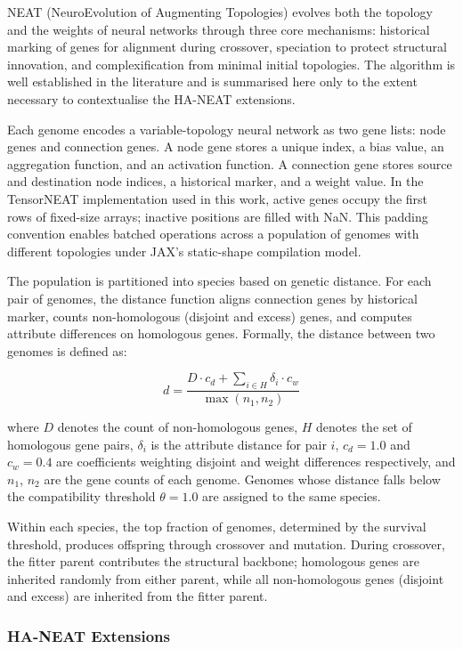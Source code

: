 \documentclass[12pt]{article}
\begin{document}
NEAT (NeuroEvolution of Augmenting Topologies) evolves both the topology and the weights of neural networks through three core mechanisms: historical marking of genes for alignment during crossover, speciation to protect structural innovation, and complexification from minimal initial topologies. The algorithm is well established in the literature and is summarised here only to the extent necessary to contextualise the HA-NEAT extensions.

Each genome encodes a variable-topology neural network as two gene lists: node genes and connection genes. A node gene stores a unique index, a bias value, an aggregation function, and an activation function. A connection gene stores source and destination node indices, a historical marker, and a weight value. In the TensorNEAT implementation used in this work, active genes occupy the first rows of fixed-size arrays; inactive positions are filled with NaN. This padding convention enables batched operations across a population of genomes with different topologies under JAX's static-shape compilation model.

The population is partitioned into species based on genetic distance. For each pair of genomes, the distance function aligns connection genes by historical marker, counts non-homologous (disjoint and excess) genes, and computes attribute differences on homologous genes. Formally, the distance between two genomes is defined as:

$$d = \frac{D \cdot c_d + \sum_{i \in H} \delta_i \cdot c_w}{\max(n_1, n_2)}$$

where $D$ denotes the count of non-homologous genes, $H$ denotes the set of homologous gene pairs, $\delta_i$ is the attribute distance for pair $i$, $c_d = 1.0$ and $c_w = 0.4$ are coefficients weighting disjoint and weight differences respectively, and $n_1$, $n_2$ are the gene counts of each genome. Genomes whose distance falls below the compatibility threshold $\theta = 1.0$ are assigned to the same species.

Within each species, the top fraction of genomes, determined by the survival threshold, produces offspring through crossover and mutation. During crossover, the fitter parent contributes the structural backbone; homologous genes are inherited randomly from either parent, while all non-homologous genes (disjoint and excess) are inherited from the fitter parent.

\subsubsection{HA-NEAT Extensions}
\end{document}
